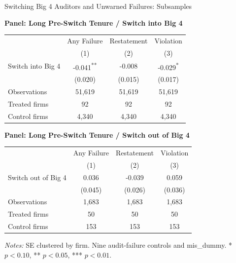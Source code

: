 \documentclass[10pt]{article}
\newcommand{\sym}[1]{\textsuperscript{#1}}
\begin{document}
\fontsize{10}{12}\selectfont
\setlength{\tabcolsep}{3pt}\renewcommand{\arraystretch}{1.15}
\begin{center}\large Switching Big 4 Auditors and Unwarned Failures: Subsamples\end{center}
\medskip\textbf{Panel: Long Pre-Switch Tenure / Switch into Big 4}\par\smallskip
\begin{tabular*}{\textwidth}{@{\extracolsep{\fill}}lccc@{}}
\toprule
 & Any Failure & Restatement & Violation \\
 & (1) & (2) & (3) \\
\midrule
Switch into Big 4 & -0.041\sym{**} & -0.008 & -0.029\sym{*} \\
 & (0.020) & (0.015) & (0.017) \\
Observations & 51,619 & 51,619 & 51,619 \\
Treated firms & 92 & 92 & 92 \\
Control firms & 4,340 & 4,340 & 4,340 \\
\bottomrule\end{tabular*}\par
\medskip\textbf{Panel: Long Pre-Switch Tenure / Switch out of Big 4}\par\smallskip
\begin{tabular*}{\textwidth}{@{\extracolsep{\fill}}lccc@{}}
\toprule
 & Any Failure & Restatement & Violation \\
 & (1) & (2) & (3) \\
\midrule
Switch out of Big 4 & 0.036 & -0.039 & 0.059 \\
 & (0.045) & (0.026) & (0.036) \\
Observations & 1,683 & 1,683 & 1,683 \\
Treated firms & 50 & 50 & 50 \\
Control firms & 153 & 153 & 153 \\
\bottomrule\end{tabular*}\par
\medskip\fontsize{9}{11}\selectfont\textit{Notes:} SE clustered by firm. Nine audit-failure controls and mis\_dummy. * $p<0.10$, ** $p<0.05$, *** $p<0.01$.
\end{document}
